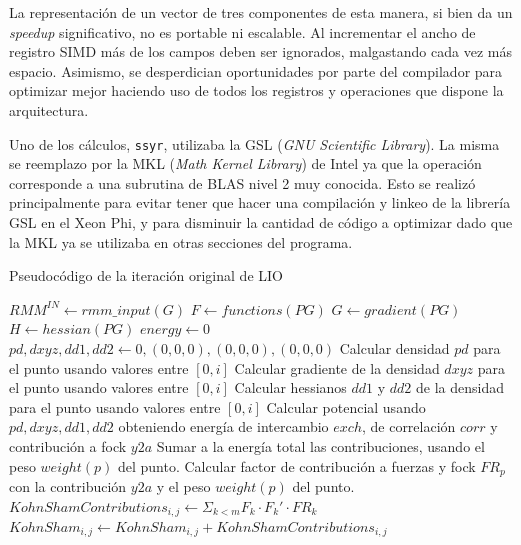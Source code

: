 La representaci\'on de un vector de tres componentes de esta manera, si bien da
un \textit{speedup} significativo, no es portable ni escalable. Al incrementar el
ancho de registro SIMD m\'as de los campos deben ser ignorados, malgastando cada
vez m\'as espacio. Asimismo, se desperdician oportunidades por parte del compilador
para optimizar mejor haciendo uso de todos los registros y operaciones que dispone
la arquitectura.

Uno de los c\'alculos, \texttt{ssyr}, utilizaba la GSL (\textit{GNU Scientific Library}).
La misma se reemplazo por la MKL (\textit{Math Kernel Library}) de Intel ya que
la operaci\'on corresponde a una subrutina de BLAS nivel 2 muy conocida. Esto se
realiz\'o principalmente para evitar tener que hacer una compilaci\'on y linkeo
de la librer\'ia GSL en el Xeon Phi, y para disminuir la cantidad de c\'odigo a
optimizar dado que la MKL ya se utilizaba en otras secciones del programa.

\begin{algorithm}[H]
        \caption{Pseudoc\'odigo de la iteraci\'on original de LIO}
        \label{algo:lio-iteration}
        \begin{algorithmic}
              \State $RMM^{IN} \gets rmm\_input(G)$
              \State $F \gets functions(PG)$
              \State $G \gets gradient(PG)$
              \State $H \gets hessian(PG)$
              \State $energy \gets 0$
                  \State $pd, dxyz,dd1,dd2 \gets 0, (0,0,0), (0,0,0), (0,0,0)$
                       \State Calcular densidad $pd$ para el punto usando valores entre $[0,i]$
                       \State Calcular gradiente de la densidad $dxyz$ para el punto usando valores entre $[0,i]$
                       \State Calcular hessianos $dd1$ y $dd2$ de la densidad para el punto usando valores entre $[0,i]$
                  \EndFor
                  \State Calcular potencial usando $pd,dxyz, dd1, dd2$ obteniendo energ\'ia de intercambio $exch$, de correlaci\'on $corr$ y contribuci\'on a fock $y2a$
                  \State Sumar a la energ\'ia total las contribuciones, usando el peso $weight(p)$ del punto.
                  \State Calcular factor de contribuci\'on a fuerzas y fock $FR_p$ con la contribuci\'on $y2a$ y el peso $weight(p)$ del punto.
              \EndFor
              \State $KohnShamContributions_{i,j} \gets \Sigma_{k < m} F_k \cdot F_k' \cdot FR_k$
                  \State $KohnSham_{i,j} \gets KohnSham_{i,j} + KohnShamContributions_{i,j}$
              \EndFor
            \EndFunction
        \end{algorithmic}
\end{algorithm}

